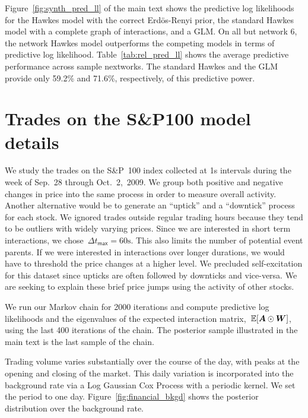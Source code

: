 Figure~\ref{fig:synth_pred_ll} of the main text shows the predictive
log likelihoods for the Hawkes model with the correct Erd\"os-Renyi
prior, the standard Hawkes model with a complete graph of
interactions, and a GLM. On all but network 6, the network Hawkes
model outperforms the competing models in terms of predictive log
likelihood. Table~\ref{tab:rel_pred_ll} shows the average predictive
performance across sample nextworks. The standard Hawkes and the GLM
provide only 59.2\% and 71.6\%, respectively, of this predictive
power.

\section{Trades on the S\&P100 model details}
We study the trades on the S\&P~100 index collected at 1s intervals
during the week of Sep.~28 through Oct.~2,~2009. We group both
positive and negative changes in price into the same process in order
to measure overall activity. Another alternative would be to generate
an ``uptick'' and a ``downtick'' process for each stock.  We ignored
trades outside regular trading hours because they tend to be outliers
with widely varying prices. Since we are interested in short term
interactions, we chose~${\Delta t_{\mathsf{max}}=60\mathrm{s}}$. This
also limits the number of potential event parents. If we were
interested in interactions over longer durations, we would have to
threshold the price changes at a higher level. We precluded
self-excitation for this dataset since upticks are often followed by
downticks and vice-versa. We are seeking to explain these brief price
jumps using the activity of other stocks.

We run our Markov chain for 2000 iterations and compute predictive log
likelihoods and the eigenvalues of the expected interaction
matrix,~${\mathbb{E}[\boldsymbol{A}\odot\boldsymbol{W}]}$, using the last 400 iterations of
the chain. The posterior sample illustrated in the main text is the
last sample of the chain.

Trading volume varies substantially over the course of the day, with
peaks at the opening and closing of the market. This daily variation
is incorporated into the background rate via a Log Gaussian Cox
Process with a periodic kernel. We set the period to one
day. Figure~\ref{fig:financial_bkgd} shows the posterior distribution
over the background rate.

